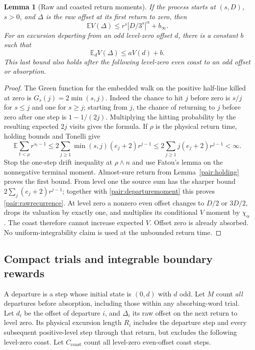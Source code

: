 \documentclass[11pt]{amsart}
\newtheorem{lemma}[theorem]{Lemma}
\theoremstyle{definition}
\theoremstyle{remark}
\newcommand{\E}{\mathbb E}
\begin{document}
\begin{lemma}[Raw and coasted return moments]\label{pair:returnmoments}
If the process starts at $(s,D)$, $s>0$, and $\Delta$ is the raw offset at its
first return to zero, then
\[
 \E V(\Delta)\le r^s|D/3^s|^\alpha+b_\infty.
\]
For an excursion departing from an odd level-zero offset $d$, there is a
constant $b$ such that
\begin{equation}\label{pair:rawrecurrence}
 \E_d V(\Delta)\le aV(d)+b.
\end{equation}
This last bound also holds after the following level-zero even coast to an
odd offset or absorption.
\end{lemma}
\begin{proof}
The Green function for the embedded walk on the positive half-line killed
at zero is $G_s(j)=2\min(s,j)$.  Indeed the chance to hit $j$ before zero
is $s/j$ for $s\le j$ and one for $s\ge j$; starting from $j$, the chance
of returning to $j$ before zero after one step is $1-1/(2j)$.  Multiplying
the hitting probability by the resulting expected $2j$ visits gives the
formula.  If $\rho$ is the physical return time, holding bounds and Tonelli
give
\[
 \E\sum_{t<\rho}r^{s_t-1}
 \le2\sum_{j\ge1}\min(s,j)(e_j+2)r^{j-1}
 \le2\sum_{j\ge1}j(e_j+2)r^{j-1}<\infty.
\]
Stop the one-step drift inequality at $\rho\wedge n$ and use Fatou's lemma
on the nonnegative terminal moment.  Almost-sure return from
Lemma~\ref{pair:holding} proves the first bound.  From level one the source
sum has the sharper bound $2\sum_j(e_j+2)r^{j-1}$; together with
\eqref{pair:departuremoment} this proves \eqref{pair:rawrecurrence}.
At level zero a nonzero even offset changes to $D/2$ or $3D/2$, drops its
valuation by exactly one, and multiplies its conditional $V$ moment by
$\chi_\alpha$.  The coast therefore cannot increase expected $V$.
Offset zero is already absorbed.  No uniform-integrability claim is used
at the unbounded return time.
\end{proof}

\subsection{Compact trials and integrable boundary rewards}

A departure is a step whose initial state is $(0,d)$ with $d$ odd.  Let
$M$ count \emph{all} departures before absorption, including those within
any absorbing-word trial.  Let $d_i$ be the offset of departure $i$, and
$\Delta_i$ its raw offset on the next return to level zero.  Its physical
excursion length $R_i$ includes the departure step and every subsequent
positive-level step through that return, but excludes the following
level-zero coast.  Let $C_{\mathrm{coast}}$ count all level-zero even-offset coast steps.
\end{document}
